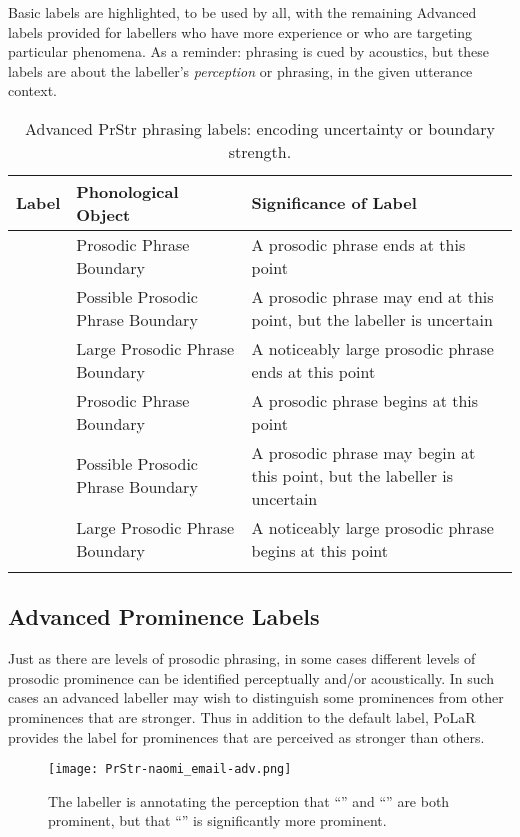 Basic labels are highlighted, to be used by all, with the remaining Advanced labels provided for labellers who have more experience or who are targeting particular phenomena. As a reminder: phrasing is cued by acoustics, but these labels are about the labeller’s \textit{perception} or phrasing, in the given utterance context.

\begin{longtable}{clp{.5\linewidth}} \toprule \textbf{Label} & \textbf{Phonological Object} & \textbf{Significance of Label}\tabularnewline
\midrule \endhead
\rowcolor{green}
\textlabel{]} & Prosodic Phrase Boundary & A prosodic phrase ends at this point \tabularnewline
\textlabel{?]} & Possible Prosodic Phrase Boundary & A prosodic phrase may end at this point, but the labeller is uncertain \tabularnewline
\textlabel{]]} & Large Prosodic Phrase Boundary & A noticeably large prosodic phrase ends at this point \tabularnewline
\textlabel{[} & Prosodic Phrase Boundary & A prosodic phrase begins at this point \tabularnewline
\textlabel{?[} & Possible Prosodic Phrase Boundary & A prosodic phrase may begin at this point, but the labeller is uncertain \tabularnewline
\textlabel{[[} & Large Prosodic Phrase Boundary & A noticeably large prosodic phrase begins at this point \tabularnewline
%
\bottomrule
\caption{Advanced PrStr phrasing labels: encoding uncertainty or boundary strength.}
\end{longtable}

\subsection{Advanced Prominence Labels}\label{sec:advanced-prominence-labels}

Just as there are levels of prosodic phrasing, in some cases different levels of prosodic prominence can be identified perceptually and/or acoustically. In such cases an advanced labeller may wish to distinguish some prominences from other prominences that are stronger. Thus in addition to the default \textlabel{*} label, PoLaR provides the \textlabel{**} label for prominences that are perceived as stronger than others.

\begin{figure}[H]
\centering
%
\texttt{[image: PrStr-naomi\_email-adv.png]}
%
\caption{The labeller is annotating the perception that “” and “” are both prominent, but that “” is significantly more prominent.%
\label{fig:naomi_email PrStr Adv}%
}
\end{figure}



